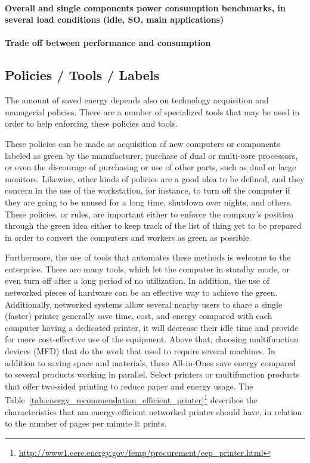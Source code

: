             \paragraph*{Overall and single components power consumption benchmarks, in several load conditions (idle, SO, main applications)}
            \paragraph*{Trade off between performance and consumption}

    \subsection{Policies / Tools / Labels} \label{sec2:policies_tools_labels}
        The amount of saved energy depends also on technology acquisition and managerial policies. There are a number of specialized tools that may be used in order to help enforcing these policies and tools. 

        These policies can be made as acquisition of new computers or components labeled as green by the manufacturer, purchase of dual or multi-core processors, or even the discourage of purchasing or use of other parts, such as dual or large monitors. Likewise, other kinds of policies are a good idea to be defined, and they concern in the use of the workstation, for instance, to turn off the computer if they are going to be unused for a long time, shutdown over nights, and others. These policies, or rules, are important either to enforce the company's position through the green idea either to keep track of the list of thing yet to be prepared in order to convert the computers and workers as green as possible.
        
        Furthermore, the use of tools that automates these methods is welcome to the enterprise. There are many tools, which let the computer in standby mode, or even turn off after a long period of no utilization. In addition, the use of networked pieces of hardware can be an effective way to achieve the green. Additionally, networked systems allow several nearby users to share a single (faster) printer generally save time, cost, and energy compared with each computer having a dedicated printer, it will decrease their idle time and provide for more cost-effective use of the equipment. Above that, choosing multifunction devices (MFD) that do the work that used to require several machines. In addition to saving space and materials, these All-in-Ones save energy compared to several products working in parallel. Select printers or multifunction products that offer two-sided printing to reduce paper and energy usage. The Table~\ref{tab:energy_recommendation_efficient_printer}\footnote{\url{http://www1.eere.energy.gov/femp/procurement/eep_printer.html}} describes the characteristics that am energy-efficient networked printer should have, in relation to the number of pages per minute it prints. 
        
